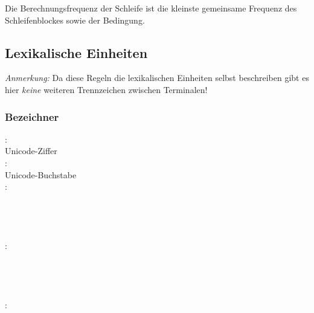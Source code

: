 Die Berechnungsfrequenz der Schleife ist die kleinste gemeinsame Frequenz des Schleifenblockes sowie der Bedingung.

\subsection{Lexikalische Einheiten}\label{Lexikalische Einheiten}

\emph{Anmerkung:} Da diese Regeln die lexikalischen Einheiten selbst beschreiben gibt es
hier \emph{keine} weiteren Trennzeichen zwischen Terminalen!


\subsubsection{Bezeichner}\label{Bezeichner}
:\label{Number}\\
\hspace*{1cm}Unicode-Ziffer\\
:\label{Letter}\\
\hspace*{1cm}Unicode-Buchstabe\\
:\label{Comp_XYZW}\\
\hspace*{1cm}\\
\hspace*{1cm}\\
\hspace*{1cm}\\
\hspace*{1cm}\\
:\label{Comp_RGBA}\\
\hspace*{1cm}\\
\hspace*{1cm}\\
\hspace*{1cm}\\
\hspace*{1cm}\\
:\label{SWIZZLE_XYZW}\\
\hspace*{1cm} \\
\hspace*{1cm} \Gspace{} \\
\hspace*{1cm} \Gspace{} \Gspace{} \\
